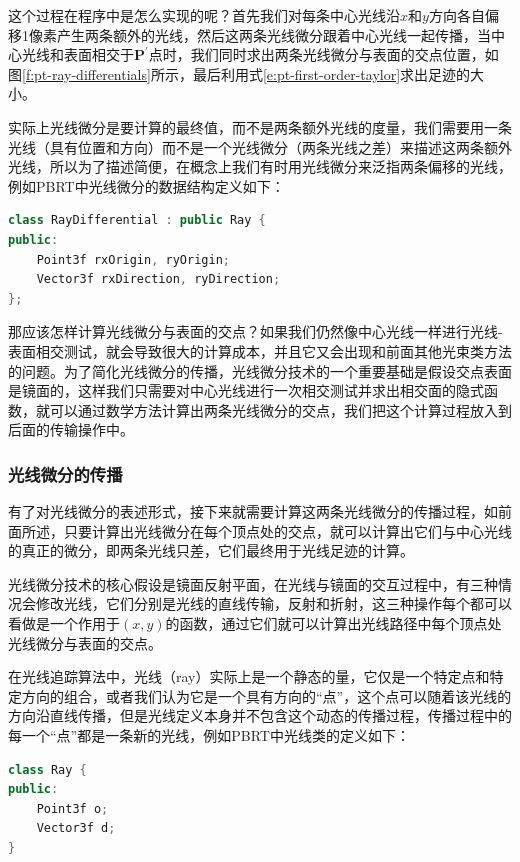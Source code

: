 这个过程在程序中是怎么实现的呢？首先我们对每条中心光线沿$x$和$y$方向各自偏移1像素产生两条额外的光线，然后这两条光线微分跟着中心光线一起传播，当中心光线和表面相交于$\mathbf{P}^{'}$点时，我们同时求出两条光线微分与表面的交点位置，如图\ref{f:pt-ray-differentials}所示，最后利用式\ref{e:pt-first-order-taylor}求出足迹的大小。

实际上光线微分是要计算的最终值，而不是两条额外光线的度量，我们需要用一条光线（具有位置和方向）而不是一个光线微分（两条光线之差）来描述这两条额外光线，所以为了描述简便，在概念上我们有时用光线微分来泛指两条偏移的光线，例如PBRT\cite{b:pbrt}中光线微分的数据结构定义如下：

\begin{lstlisting}[language=C++]
class RayDifferential : public Ray { 
public:
	Point3f rxOrigin, ryOrigin;
	Vector3f rxDirection, ryDirection;
};
\end{lstlisting}

那应该怎样计算光线微分与表面的交点？如果我们仍然像中心光线一样进行光线-表面相交测试，就会导致很大的计算成本，并且它又会出现和前面其他光束类方法的问题。为了简化光线微分的传播，光线微分技术的一个重要基础是假设交点表面是镜面的，这样我们只需要对中心光线进行一次相交测试并求出相交面的隐式函数，就可以通过数学方法计算出两条光线微分的交点，我们把这个计算过程放入到后面的传输操作中。






\subsubsection{光线微分的传播}
有了对光线微分的表述形式，接下来就需要计算这两条光线微分的传播过程，如前面所述，只要计算出光线微分在每个顶点处的交点，就可以计算出它们与中心光线的真正的微分，即两条光线只差，它们最终用于光线足迹的计算。

光线微分技术的核心假设是镜面反射平面，在光线与镜面的交互过程中，有三种情况会修改光线，它们分别是光线的直线传输，反射和折射，这三种操作每个都可以看做是一个作用于$(x,y)$的函数，通过它们就可以计算出光线路径中每个顶点处光线微分与表面的交点。

在光线追踪算法中，光线（ray）实际上是一个静态的量，它仅是一个特定点和特定方向的组合，或者我们认为它是一个具有方向的“点”，这个点可以随着该光线的方向沿直线传播，但是光线定义本身并不包含这个动态的传播过程，传播过程中的每一个“点”都是一条新的光线，例如PBRT中光线类的定义如下：

\begin{lstlisting}[language=C++]
class Ray {
public:
    Point3f o;
    Vector3f d;
}
\end{lstlisting}

